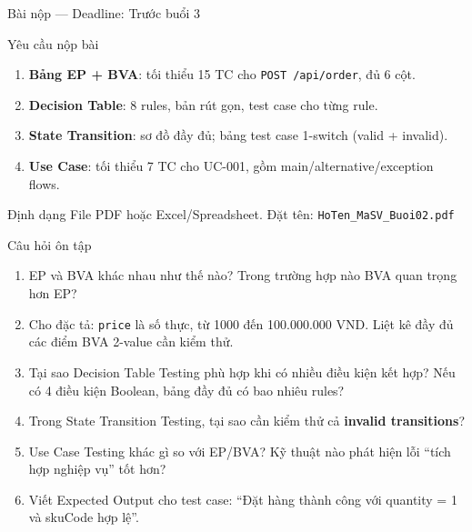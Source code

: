 \documentclass[aspectratio=169,12pt]{beamer}
\begin{document}
\begin{frame}[shrink=12]{Bài nộp --- Deadline: Trước buổi 3}
  \begin{block}{Yêu cầu nộp bài}
    \small
    \begin{enumerate}
      \item \textbf{Bảng EP + BVA}: tối thiểu 15 TC cho \texttt{POST /api/order}, đủ 6 cột.

      \item \textbf{Decision Table}: 8 rules, bản rút gọn, test case cho từng rule.

      \item \textbf{State Transition}: sơ đồ đầy đủ; bảng test case 1-switch (valid + invalid).

      \item \textbf{Use Case}: tối thiểu 7 TC cho UC-001, gồm main/alternative/exception flows.
    \end{enumerate}
  \end{block}

  \vspace{0.05em}
  \begin{alertblock}{Định dạng}
    \small File PDF hoặc Excel/Spreadsheet. Đặt tên: \texttt{HoTen\_MaSV\_Buoi02.pdf}
  \end{alertblock}
\end{frame}

\begin{frame}{Câu hỏi ôn tập}
  \begin{enumerate}
    \item EP và BVA khác nhau như thế nào? Trong trường hợp nào BVA
      quan trọng hơn EP?

    \item Cho đặc tả: \texttt{price} là số thực, từ 1000 đến 100.000.000 VND.
      Liệt kê đầy đủ các điểm BVA 2-value cần kiểm thử.

    \item Tại sao Decision Table Testing phù hợp khi có nhiều điều kiện kết hợp?
      Nếu có 4 điều kiện Boolean, bảng đầy đủ có bao nhiêu rules?

    \item Trong State Transition Testing, tại sao cần kiểm thử cả
      \textbf{invalid transitions}?

    \item Use Case Testing khác gì so với EP/BVA? Kỹ thuật nào phát hiện
      lỗi ``tích hợp nghiệp vụ'' tốt hơn?

    \item Viết Expected Output cho test case: ``Đặt hàng thành công với
      quantity = 1 và skuCode hợp lệ''.
  \end{enumerate}
\end{frame}
\end{document}
